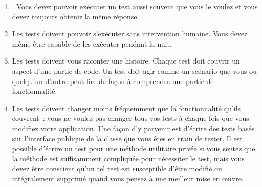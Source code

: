 \documentclass[a4paper,10pt,twoside]{book}
\begin{document}
\begin{enumerate}
\item {}. Vous devez pouvoir exécuter un test aussi souvent que vous le voulez et vous devez toujours obtenir la même réponse.


\item Les tests doivent pouvoir s'exécuter sans intervention humaine. Vous devez même être capable de les exécuter pendant la nuit.


\item Les tests doivent vous raconter une histoire.  Chaque test doit couvrir un aspect d'une partie de code. Un test doit agir comme un scénario que vous ou quelqu'un d'autre peut lire de façon à comprendre une partie de fonctionnalité.\label{prop:oneAspect} 


\item Les tests doivent changer moins fréquemment que la fonctionnalité qu'ils couvrent~: vous ne voulez pas changer tous vos tests à chaque fois que vous modifiez votre application. Une façon d'y parvenir est d'écrire des tests basés sur l'interface publique de la classe que vous êtes en train de tester. 
Il est possible d'écrire un test pour une méthode utilitaire privée si vous sentez que la méthode est suffisamment compliquée pour nécessiter le test, mais vous devez être conscient qu'un tel test est susceptible d'être modifié ou intégralement supprimé quand vous pensez à une meilleur mise en \oe uvre.
\end{enumerate}
\end{document}
